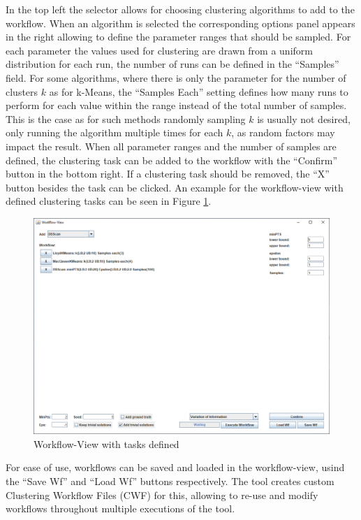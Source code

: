 \documentclass[
	a4paper,
	english,
	twoside,
	openright,               
	11pt                            
	]{report}
\begin{document}
In the top left the selector allows for choosing clustering algorithms to add to the workflow. When an algorithm is selected the corresponding options panel appears in the right allowing to define the parameter ranges that should be sampled. For each parameter the values used for clustering are drawn from a uniform distribution for each run, the number of runs can be defined in the ``Samples'' field. For some algorithms, where there is only the parameter for the number of clusters $k$ as for k-Means, the ``Samples Each'' setting defines how many runs to perform for each value within the range instead of the total number of samples. This is the case as for such methods randomly sampling $k$ is usually not desired, only running the algorithm multiple times for each $k$, as random factors may impact the result. When all parameter ranges and the number of samples are defined, the clustering task can be added to the workflow with the ``Confirm'' button in the bottom right. If a clustering task should be removed, the ``X'' button besides the task can be clicked. An example for the workflow-view with defined clustering tasks can be seen in Figure \ref{fig:workflow-view-tasks}.

\begin{figure}[h]
	\centering
	\includegraphics[scale=.43]{workflow-view-tasks}
	\caption{Workflow-View with tasks defined}
	\label{fig:workflow-view-tasks}
\end{figure}

For ease of use, workflows can be saved and loaded in the workflow-view, usind the ``Save Wf'' and ``Load Wf'' buttons respectively. The tool creates custom Clustering Workflow Files (CWF) for this, allowing to re-use and modify workflows throughout multiple executions of the tool.
\end{document}

